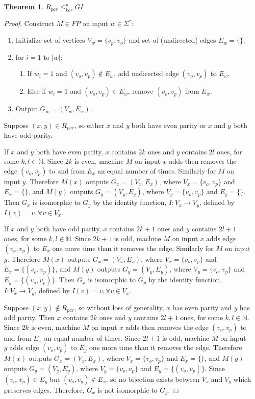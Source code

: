 \documentclass{article}
\newtheorem{theorem}{Theorem}[section]
\theoremstyle{definition}
\newcommand{\sigmastar}{\Sigma^{*}}
\newcommand{\kr}{\leq^{p}_{ker}}
\begin{document}
\begin{theorem}$R_{par}\kr GI$\end{theorem}
\begin{proof}
  Construct $M\in FP$ on input $w\in\sigmastar$:
  \begin{enumerate}
  \item Initialize set of vertices $V_w=\{v_{p}, v_{o}\}$ and set of
    (undirected) edges $E_w=\{\}$.
  \item for $i=1$ to $|w|$:
    \begin{enumerate}
    \item If $w_i=1$ and $(v_{o}, v_{p})\notin E_w$, add undirected edge
      $(v_{o}, v_{p})$ to $E_w$.
    \item Else if $w_i=1$ and $(v_{o}, v_{p})\in E_w$, remove $(v_{o}, v_{p})$
      from $E_w$.
    \end{enumerate}
  \item Output $G_w=(V_w,E_w)$.
  \end{enumerate}

  Suppose $(x,y)\in R_{par}$, so either $x$ and $y$ both have even parity or
  $x$ and $y$ both have odd parity. 

  If $x$ and $y$ both have even parity, $x$ contains $2k$ ones and $y$ contains
  $2l$ ones, for some $k,l\in\mathbb{N}$. Since $2k$ is even, machine $M$ on
  input $x$ adds then removes the edge $(v_o, v_p)$ to and from $E_x$ an equal
  number of times. Similarly for $M$ on input $y$. Therefore $M(x)$ outputs
  $G_x=(V_x, E_x)$, where $V_x=\{v_o, v_p\}$ and $E_x=\{\}$, and $M(y)$ outputs
  $G_y=(V_y, E_y)$, where $V_y=\{v_o, v_p\}$ and $E_y=\{\}$. Then $G_x$ is
  isomorphic to $G_y$ by the identity function, $I:V_x\to V_y$, defined by
  $I(v)=v, \forall v\in V_x$.

  If $x$ and $y$ both have odd parity, $x$ contains $2k+1$ ones and $y$
  contains $2l+1$ ones, for some $k,l\in\mathbb{N}$. Since $2k+1$ is odd,
  machine $M$ on input $x$ adds edge $(v_o, v_p)$ to $E_x$ one more time than
  it removes the edge. Similarly for $M$ on input $y$. Therefore $M(x)$ outputs
  $G_x=(V_x, E_x)$, where $V_x=\{v_o, v_p\}$ and $E_x=\{(v_o, v_p)\}$, and
  $M(y)$ outputs $G_y=(V_y, E_y)$, where $V_y=\{v_o, v_p\}$ and $E_y=\{(v_o,
  v_p)\}$. Then $G_x$ is isomorphic to $G_y$ by the identity function,
  $I:V_x\to V_y$, defined by $I(v)=v, \forall v\in V_x$.

  Suppose $(x,y)\notin R_{par}$, so without loss of generality, $x$ has even
  parity and $y$ has odd parity. Then $x$ contains $2k$ ones and $y$ contains
  $2l+1$ ones, for some $k,l\in\mathbb{N}$. Since $2k$ is even, machine $M$ on
  input $x$ adds then removes the edge $(v_o, v_p)$ to and from $E_x$ an equal
  number of times. Since $2l+1$ is odd, machine $M$ on input $y$ adds edge
  $(v_o, v_p)$ to $E_y$ one more time than it removes the edge. Therefore
  $M(x)$ outputs $G_x=(V_x, E_x)$, where $V_x=\{v_o, v_p\}$ and $E_x=\{\}$, and
  $M(y)$ outputs $G_y=(V_y, E_y)$, where $V_y=\{v_o, v_p\}$ and $E_y=\{(v_o,
  v_p)\}$. Since $(v_o, v_p)\in E_y$ but $(v_o, v_p)\notin E_x$, so no
  bijection exists between $V_x$ and $V_y$ which preserves edges. Therefore,
  $G_x$ is not isomorphic to $G_y$.


\end{proof}
\end{document}
